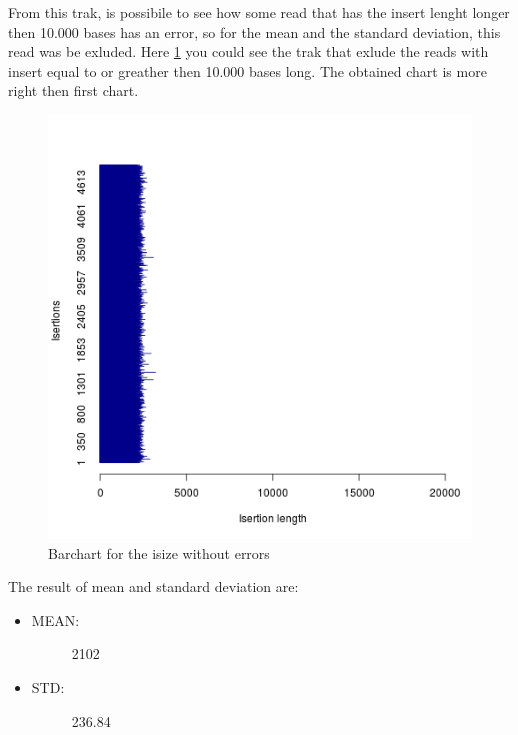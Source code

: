 From this trak, is possibile to see how some read that has the insert lenght longer then 10.000 bases has an error, so for the mean and the standard deviation, this read was be exluded.
Here \ref{fig:2} you could see the trak that exlude the reads with insert equal to or greather then 10.000 bases long. The obtained chart is more right then first chart.
 \begin{figure}[H]
				\centering
				\includegraphics[scale=0.8]{immagini/r1.png}
				\caption{Barchart for the isize without errors}\label{fig:2}
				\end{figure}

The result of mean and standard deviation are:
\begin{itemize}
\item \begin{description}
		\item[MEAN:] 2102
  \end{description}
\end{itemize}

\begin{itemize}
\item \begin{description}
		\item[STD:] 236.84
  \end{description}
\end{itemize}


